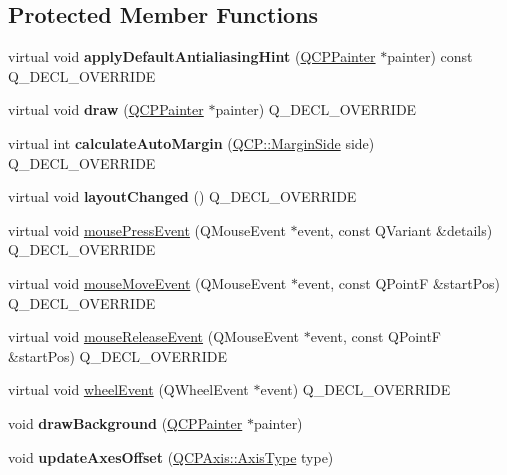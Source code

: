 \subsection*{Protected Member Functions}
\begin{DoxyCompactItemize}
\item 
\mbox{\label{class_q_c_p_axis_rect_a4a318008e2b7f881a14c3d97186b31f9}} 
virtual void {\bfseries apply\+Default\+Antialiasing\+Hint} (\hyperlink{class_q_c_p_painter}{Q\+C\+P\+Painter} $\ast$painter) const Q\+\_\+\+D\+E\+C\+L\+\_\+\+O\+V\+E\+R\+R\+I\+DE
\item 
\mbox{\label{class_q_c_p_axis_rect_af710c50530e370539a4439d6c4db9090}} 
virtual void {\bfseries draw} (\hyperlink{class_q_c_p_painter}{Q\+C\+P\+Painter} $\ast$painter) Q\+\_\+\+D\+E\+C\+L\+\_\+\+O\+V\+E\+R\+R\+I\+DE
\item 
\mbox{\label{class_q_c_p_axis_rect_ac51055d83f5f414b6d013d3a24b0a941}} 
virtual int {\bfseries calculate\+Auto\+Margin} (\hyperlink{namespace_q_c_p_a7e487e3e2ccb62ab7771065bab7cae54}{Q\+C\+P\+::\+Margin\+Side} side) Q\+\_\+\+D\+E\+C\+L\+\_\+\+O\+V\+E\+R\+R\+I\+DE
\item 
\mbox{\label{class_q_c_p_axis_rect_a575e38ac71a21906dc2d7b3364db2d62}} 
virtual void {\bfseries layout\+Changed} () Q\+\_\+\+D\+E\+C\+L\+\_\+\+O\+V\+E\+R\+R\+I\+DE
\item 
virtual void \hyperlink{class_q_c_p_axis_rect_aa9a7c807eaa4666870ac94aa6abc4dde}{mouse\+Press\+Event} (Q\+Mouse\+Event $\ast$event, const Q\+Variant \&details) Q\+\_\+\+D\+E\+C\+L\+\_\+\+O\+V\+E\+R\+R\+I\+DE
\item 
virtual void \hyperlink{class_q_c_p_axis_rect_a9cd27ad8c5cfb49aefd9dbb30def4beb}{mouse\+Move\+Event} (Q\+Mouse\+Event $\ast$event, const Q\+PointF \&start\+Pos) Q\+\_\+\+D\+E\+C\+L\+\_\+\+O\+V\+E\+R\+R\+I\+DE
\item 
virtual void \hyperlink{class_q_c_p_axis_rect_a6c89b988d3a0b93c0878f0ebdb5037f4}{mouse\+Release\+Event} (Q\+Mouse\+Event $\ast$event, const Q\+PointF \&start\+Pos) Q\+\_\+\+D\+E\+C\+L\+\_\+\+O\+V\+E\+R\+R\+I\+DE
\item 
virtual void \hyperlink{class_q_c_p_axis_rect_a93eeaa0c127d6d6fe8171b2455080262}{wheel\+Event} (Q\+Wheel\+Event $\ast$event) Q\+\_\+\+D\+E\+C\+L\+\_\+\+O\+V\+E\+R\+R\+I\+DE
\item 
\mbox{\label{class_q_c_p_axis_rect_ab49d338d1ce74b476fcead5b32cf06dc}} 
void {\bfseries draw\+Background} (\hyperlink{class_q_c_p_painter}{Q\+C\+P\+Painter} $\ast$painter)
\item 
\mbox{\label{class_q_c_p_axis_rect_a6024ccdc74f5dc0e8a0fe482e5b28a20}} 
void {\bfseries update\+Axes\+Offset} (\hyperlink{class_q_c_p_axis_ae2bcc1728b382f10f064612b368bc18a}{Q\+C\+P\+Axis\+::\+Axis\+Type} type)
\end{DoxyCompactItemize}
